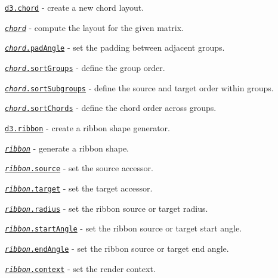 \begin{DoxyItemize}
\item \href{https://github.com/d3/d3-chord/blob/master/README.md#chord}{\tt d3.\+chord} -\/ create a new chord layout.
\item \href{https://github.com/d3/d3-chord/blob/master/README.md#_chord}{\tt {\itshape chord}} -\/ compute the layout for the given matrix.
\item \href{https://github.com/d3/d3-chord/blob/master/README.md#chord_padAngle}{\tt {\itshape chord}.pad\+Angle} -\/ set the padding between adjacent groups.
\item \href{https://github.com/d3/d3-chord/blob/master/README.md#chord_sortGroups}{\tt {\itshape chord}.sort\+Groups} -\/ define the group order.
\item \href{https://github.com/d3/d3-chord/blob/master/README.md#chord_sortSubgroups}{\tt {\itshape chord}.sort\+Subgroups} -\/ define the source and target order within groups.
\item \href{https://github.com/d3/d3-chord/blob/master/README.md#chord_sortChords}{\tt {\itshape chord}.sort\+Chords} -\/ define the chord order across groups.
\item \href{https://github.com/d3/d3-chord/blob/master/README.md#ribbon}{\tt d3.\+ribbon} -\/ create a ribbon shape generator.
\item \href{https://github.com/d3/d3-chord/blob/master/README.md#_ribbon}{\tt {\itshape ribbon}} -\/ generate a ribbon shape.
\item \href{https://github.com/d3/d3-chord/blob/master/README.md#ribbon_source}{\tt {\itshape ribbon}.source} -\/ set the source accessor.
\item \href{https://github.com/d3/d3-chord/blob/master/README.md#ribbon_target}{\tt {\itshape ribbon}.target} -\/ set the target accessor.
\item \href{https://github.com/d3/d3-chord/blob/master/README.md#ribbon_radius}{\tt {\itshape ribbon}.radius} -\/ set the ribbon source or target radius.
\item \href{https://github.com/d3/d3-chord/blob/master/README.md#ribbon_startAngle}{\tt {\itshape ribbon}.start\+Angle} -\/ set the ribbon source or target start angle.
\item \href{https://github.com/d3/d3-chord/blob/master/README.md#ribbon_endAngle}{\tt {\itshape ribbon}.end\+Angle} -\/ set the ribbon source or target end angle.
\item \href{https://github.com/d3/d3-chord/blob/master/README.md#ribbon_context}{\tt {\itshape ribbon}.context} -\/ set the render context.
\end{DoxyItemize}

